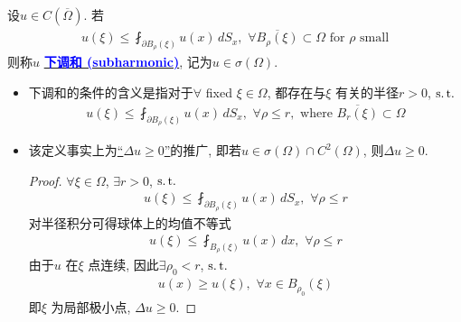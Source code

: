 	\begin{defn}\label{def 3.6.1}
		设$u \in C \left( \overline{\Omega} \right)$. 若
		\begin{align*}
			u(\xi) \leq \fint_{\partial B_{\rho}(\xi)} u(x) \, dS_x , \,\, \forall \overline{B_{\rho}(\xi)} \subset \Omega \,\, \text{for $\rho$ small}
		\end{align*}
		则称$u$ \underline{\textcolor{blue}{\textbf{下调和 (subharmonic)}}}, 记为$u \in \sigma(\Omega)$. 
		
		\vspace*{4em}
		
		\begin{rmk}
			\begin{itemize}
				\item 下调和的条件的含义是指对于$\forall$ fixed $\xi \in \Omega$, 都存在与$\xi$ 有关的半径$r > 0$, $\operatorname{s.t.}$
				\begin{align*}
					u(\xi) \leq \fint_{\partial B_{\rho}(\xi)} u(x) \, dS_x , \,\, \forall \rho \leq r , \,\, \text{where} \,\, \overline{B_{r}(\xi)} \subset \Omega
				\end{align*}
				
				\vspace*{4em}
				
				\item 该定义事实上为\underline{“$\Delta u \geq 0$”}的推广, 即若$u \in \sigma(\Omega) \cap C^2(\Omega)$, 则$\Delta u \geq 0$. 
				
				\vspace*{2em}
				
				\begin{proof}
					$\forall \xi \in \Omega$, $\exists r > 0$, $\operatorname{s.t.}$
					\begin{align*}
						u(\xi) \leq \fint_{\partial B_{\rho}(\xi)} u(x) \, dS_x , \,\, \forall \rho \leq r
					\end{align*}
					对半径积分可得球体上的均值不等式
					\begin{align*}
						u(\xi) \leq \fint_{B_{\rho}(\xi)} u(x) \, dx , \,\, \forall \rho \leq r
					\end{align*}
					由于$u$ 在$\xi$ 点连续, 因此$\exists \rho_0 < r$, $\operatorname{s.t.}$
					\begin{align*}
						u(x) \geq u(\xi) , \,\, \forall x \in B_{\rho_0}(\xi)
					\end{align*}
					即$\xi$ 为局部极小点, $\Delta u \geq 0$. 
				\end{proof}
			\end{itemize}
		\end{rmk}
	\end{defn}

